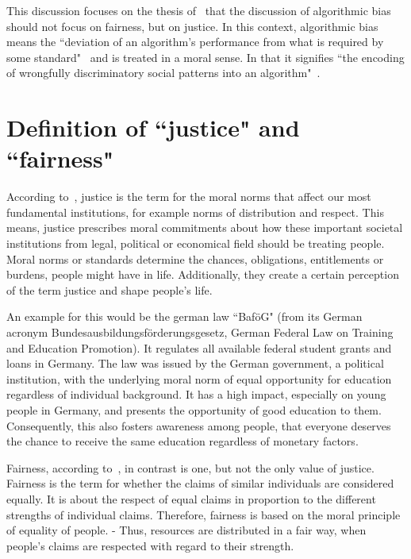 
This discussion focuses on the thesis of~\cite{vredenburgh} that the discussion of algorithmic bias should not focus on fairness, but on justice.
In this context, algorithmic bias means the ``deviation of an algorithm’s performance from what is required by some standard"~\parencite[][1]{vredenburgh} and is treated in a moral sense.
In that it signifies ``the encoding of wrongfully discriminatory social patterns into an algorithm"~\parencite[][2]{vredenburgh}.

\section*{Definition of ``justice" and ``fairness" }

According to~\cite[3, 11--12]{vredenburgh}, justice is the term for the moral norms that affect our most fundamental institutions, for example norms of distribution and respect.
This means, justice prescribes moral commitments about how these important societal institutions from legal, political or economical field should be treating people.
Moral norms or standards determine the chances, obligations, entitlements or burdens, people might have in life.
Additionally, they create a certain perception of the term justice and shape people's life.

An example for this would be the german law ``BaföG" (from its German acronym Bundesausbildungsförderungsgesetz, German Federal Law on Training and Education Promotion).
It regulates all available federal student grants and loans in Germany.
The law was issued by the German government, a political institution, with the underlying moral norm of equal opportunity for education regardless of individual background.
It has a high impact, especially on young people in Germany, and presents the opportunity of good education to them.
Consequently, this also fosters awareness among people, that everyone deserves the chance to receive the same education regardless of monetary factors.

Fairness, according to~\cite[3, 13]{vredenburgh}, in contrast is one, but not the only value of justice.
Fairness is the term for whether the claims of similar individuals are considered equally.
It is about the respect of equal claims in proportion to the different strengths of individual claims.
Therefore, fairness is based on the moral principle of equality of people.
- Thus, resources are distributed in a fair way, when people's claims are respected with regard to their strength.


